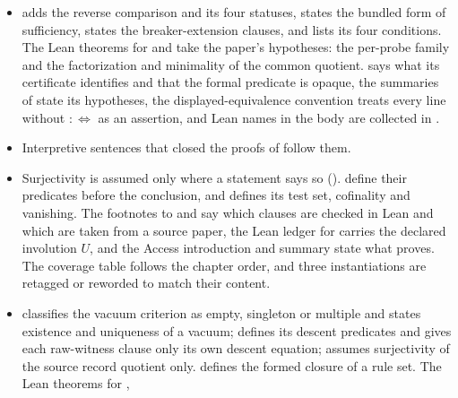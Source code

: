 \begin{itemize}
  record-level form;  and  define the strict layer
  extension and counterfactual legitimacy. In ,
  ,  and  definitions precede the
  proved lines. The Lean theorems for , , ,
   and  carry each hypothesis only where the paper uses
  it. The summary of  says that the sources take their domination
  bounds as input, and the catalog-boundary definition is linked to
  .
\item {} adds the reverse comparison and its four statuses,
   states the bundled form of sufficiency,  states
  the breaker-extension clauses, and  lists its four conditions.
  The Lean theorems for  and  take the paper's hypotheses:
  the per-probe family and the factorization and minimality of the common
  quotient.  says what its certificate identifies and that
  the formal predicate is opaque, the summaries of  state its
  hypotheses, the displayed-equivalence convention treats every line without
  \(:\Longleftrightarrow\) as an assertion, and Lean names in the body are
  collected in .
\item Interpretive sentences that closed the proofs of
   follow them.
\item Surjectivity is assumed only where a statement says so
  ().  define
  their predicates before the conclusion, and  defines its test
  set, cofinality and vanishing. The footnotes to  and
   say which clauses are checked in Lean and which are taken
  from a source paper, the Lean ledger for  carries the declared
  involution \(U\), and the Access introduction and summary state what
   proves. The coverage table follows the chapter order, and
  three instantiations are retagged or reworded to match their content.
\item {} classifies the vacuum criterion as empty, singleton or
  multiple and states existence and uniqueness of a vacuum;
   defines its descent predicates and gives each raw-witness
  clause only its own descent equation;  assumes surjectivity of
  the source record quotient only.  defines the
  formed closure of a rule set. The Lean theorems for ,

\end{itemize}
